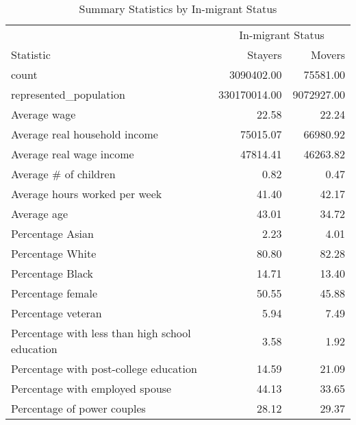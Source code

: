 \begin{table}

\caption{Summary Statistics by In-migrant Status}
\centering
\begin{tabular}[t]{lrr}
\toprule
\multicolumn{1}{c}{ } & \multicolumn{2}{c}{In-migrant Status} \\
\cmidrule(l{3pt}r{3pt}){2-3}
Statistic & Stayers & Movers\\
\midrule
count & 3090402.00 & 75581.00\\
represented\_population & 330170014.00 & 9072927.00\\
Average wage & 22.58 & 22.24\\
Average real household income & 75015.07 & 66980.92\\
Average real wage income & 47814.41 & 46263.82\\
\addlinespace
Average \# of children & 0.82 & 0.47\\
Average hours worked per week & 41.40 & 42.17\\
Average age & 43.01 & 34.72\\
Percentage Asian & 2.23 & 4.01\\
Percentage White & 80.80 & 82.28\\
\addlinespace
Percentage Black & 14.71 & 13.40\\
Percentage female & 50.55 & 45.88\\
Percentage veteran & 5.94 & 7.49\\
Percentage with less than high school education & 3.58 & 1.92\\
Percentage with post-college education & 14.59 & 21.09\\
\addlinespace
Percentage with employed spouse & 44.13 & 33.65\\
Percentage of power couples & 28.12 & 29.37\\
\bottomrule
\end{tabular}
\end{table}
